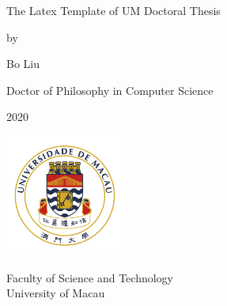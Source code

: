 \documentclass[a4paper, 12pt, twoside]{report}
\title{}
\author{}
\date{}
\begin{document}
\begin{titlepage}
    \begin{center}
        \vspace*{2.5cm}
         \large
        The Latex Template of UM Doctoral Thesis
 
        \vspace{0.8cm}
        \large
        by
 
        \vspace{0.8cm}
 
        Bo Liu
 
        \vspace{0.8cm}
 
        Doctor of Philosophy in Computer Science
        
        \vspace{0.5cm}
        
 
        \vspace{4cm}
        
        2020
        
        \vspace{1cm}
 
        \includegraphics[width=0.3\textwidth]{university}
        
 
        \large
        Faculty of Science and Technology\\
        University of Macau\\
        
 
    \end{center}
\end{titlepage}
\end{document}

